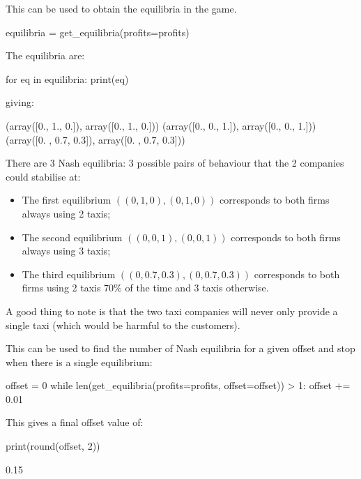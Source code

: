 This can be used to obtain the equilibria in the game.

\begin{pyin}
equilibria = get_equilibria(profits=profits)
\end{pyin}

The equilibria are:

\begin{pyin}
for eq in equilibria:
    print(eq)
\end{pyin}

giving:

\begin{pyout}
(array([0., 1., 0.]), array([0., 1., 0.]))
(array([0., 0., 1.]), array([0., 0., 1.]))
(array([0. , 0.7, 0.3]), array([0. , 0.7, 0.3]))
\end{pyout}

There are 3 Nash equilibria: 3 possible pairs of behaviour that the 2
companies could stabilise at:

\begin{itemize}
    \item The first equilibrium \(((0, 1, 0), (0, 1, 0))\) corresponds to both
          firms always using 2 taxis;
    \item The second equilibrium \(((0, 0, 1), (0, 0, 1))\) corresponds to both
          firms always using 3 taxis;
    \item The third equilibrium \(((0, 0.7, 0.3), (0, 0.7, 0.3))\) corresponds to
          both firms using 2 taxis 70\% of the time and 3 taxis otherwise.
\end{itemize}

A good thing to note is that the two taxi companies will never only provide a
single taxi (which would be harmful to the customers).

This can be used to find the number of Nash equilibria for a given offset and
stop when there is a single equilibrium:

\begin{pyin}
offset = 0
while len(get_equilibria(profits=profits, offset=offset)) > 1:
    offset += 0.01
\end{pyin}

This gives a final offset value of:

\begin{pyin}
print(round(offset, 2))
\end{pyin}


\begin{pyout}
0.15
\end{pyout}

